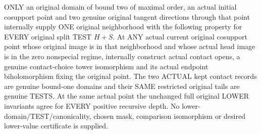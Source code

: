 \begin{theorem}
\label{hir:original-zero-contact-independent-curve-full-values}
\leanok
ONLY an original domain of bound two of maximal order, an actual initial
cosupport point and two genuine original tangent directions through that
point internally supply ONE original neighborhood with the following
property for EVERY original split TEST $H+S$. At ANY actual current
original cosupport point whose original image is in that neighborhood and
whose actual head image is in the zero nonspecial regime, internally
construct actual contact opens, a genuine contact-choice tower
isomorphism and its actual endpoint biholomorphism fixing the original
point. The two ACTUAL kept contact records are genuine bound-one domains
and their SAME restricted original tails are genuine TESTS. At the same
actual point the unchanged full original LOWER invariants agree for EVERY
positive recursive depth. No lower-domain/TEST/canonicality, chosen mask,
comparison isomorphism or desired lower-value certificate is supplied.
\end{theorem}
